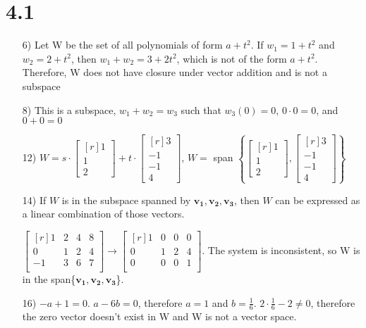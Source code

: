 \documentclass{article}
\begin{document}
  \section * {4.1}
    \begin{enumerate}
    \item[6)]
      Let W be the set of all polynomials of form $a+t^2$. If
      $w_1=1+t^2$ and $w_2=2+t^2$, then $w_1+w_2=3+2t^2$, which
      is not of the form $a+t^2$. Therefore, W does not have
      closure under vector addition and is not a subspace

    \item[8)]
      This is a subspace, $w_1+w_2=w_3$ such that $w_3(0)=0$, 
      $0\cdot0=0$, and $0+0=0$

    \item[12)]
      $W=s\cdot\begin{bmatrix*}[r]
        1\\1\\2\end{bmatrix*}
      +t\cdot\begin{bmatrix*}[r]
      3\\-1\\-1\\4\end{bmatrix*}$, $W=$ span
      $\left\{\begin{bmatrix*}[r]
        1\\1\\2\end{bmatrix*}, \begin{bmatrix*}[r]
        3\\-1\\-1\\4\end{bmatrix*}\right\}$

    \item[14)]
      If $W$ is in the subspace spanned by $\mathbf{v_1, 
      v_2, v_3}$, then $W$ can be expressed as a linear 
      combination of those vectors.

      $\begin{bmatrix*}[r]
        1&2&4&8\\
        0&1&2&4\\
        -1&3&6&7\\
        \end{bmatrix*}\rightarrow\begin{bmatrix*}[r]
          1&0&0&0\\
          0&1&2&4\\
          0&0&0&1\\
        \end{bmatrix*}$. The system is inconsistent, so W is
        in the span\{$\mathbf{v_1, v_2, v_3}$\}.

    \item[16)]
      $-a + 1 = 0$. $a-6b=0$, therefore 
      $a=1$ and $b=\frac{1}{6}$. $2\cdot\frac{1}{6}-2\neq0$, 
      therefore the zero vector doesn't exist in W and W 
      is not a vector space.

    \end{enumerate}
\end{document}
